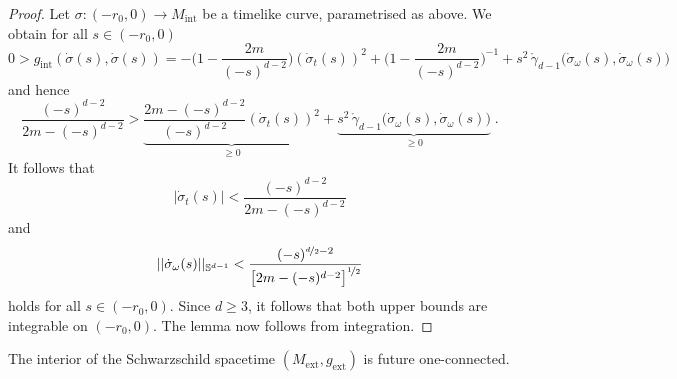 \documentclass[reqno]{article}
\newcommand{\Sd}{\mathbb{S}^{d-1}}
\newcommand{\Mint}{M_{\mathrm{int}}}
\newcommand{\gint}{g_{\mathrm{int}}}
\newcommand{\Mext}{M_{\mathrm{ext}}}
\newcommand{\gext}{g_{\mathrm{ext}}}
\begin{document}
\begin{proof}
Let $\sigma : (-r_0,0) \to \Mint$ be a timelike curve, parametrised as above. We obtain for all $s \in (-r_0,0)$
\begin{equation*}
0 > \gint(\dot{\sigma}(s),\dot{\sigma}(s)) = -\big(1- \frac{2m}{(-s)^{d-2}}\big) (\dot{\sigma}_t(s))^2 + \big(1- \frac{2m}{(-s)^{d-2}}\big)^{-1} + s^2 \, \mathring{\gamma}_{d-1}\big(\dot{\sigma}_{\omega}(s), \dot{\sigma}_{\omega}(s)\big) 
\end{equation*}
and hence
\begin{equation*}
\frac{(-s)^{d-2}}{2m - (-s)^{d-2}}  >  \underbrace{\frac{2m - (-s)^{d-2}}{(-s)^{d-2}} (\dot{\sigma}_t(s))^2}_{\geq 0}  + \underbrace{ s^2 \, \mathring{\gamma}_{d-1}\big(\dot{\sigma}_{\omega}(s), \dot{\sigma}_{\omega}(s)\big)}_{\geq 0} \;.
\end{equation*}
It follows that
\begin{equation}
\label{BoundTVel}
|\dot{\sigma}_t(s)| < \frac{(-s)^{d-2}}{2m - (-s)^{d-2}} 
\end{equation}
and
\begin{equation}
\label{BoundAngVel}
||\dot{\sigma}_\omega(s)||_{\Sd} < \frac{(-s)^{\nicefrac{d}{2} - 2}}{\big[2m - (-s)^{d-2}\big]^{\nicefrac{1}{2}}}
\end{equation}
holds for all $s \in (-r_0,0)$. Since $d \geq 3$, it follows that both upper bounds are integrable on $(-r_0,0)$. The lemma now follows from integration.
\end{proof}



\begin{proposition}
\label{IntFutCon}
The interior of the Schwarzschild spacetime $(\Mext, \gext)$ is future one-connected.
\end{proposition}
\end{document}
